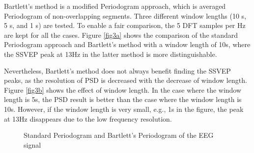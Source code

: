 \documentclass[10pt]{article}
\begin{document}
Bartlett’s method is a modified Periodogram approach, which is averaged 
Periodogram of non-overlapping segments. Three different window lengths 
(10 s, 5 s, and 1 s) are tested. To enable a fair comparison, the 5 DFT 
samples per Hz are kept for all the cases. Figure \ref{fig3a} shows the comparison 
of the standard Periodogram approach and Bartlett’s method with a window 
length of 10s, where the SSVEP peak at 13Hz in the latter method is more 
distinguishable. 

Nevertheless, Bartlett’s method does not always benefit finding the SSVEP 
peaks, as the resolution of PSD is decreased with the decrease of window 
length. Figure \ref{fig3b} shows the effect of window length. In the case where the 
window length is 5s, the PSD result is better than the case where the 
window length is 10s. However, if the window length is very small, 
e.g., 1s in the figure, the peak at 13Hz disappears due to the low 
frequency resolution.

\begin{figure}[htbp]
    \centering
    \caption{Standard Periodogram and Bartlett's Periodogram of the EEG signal}
    \label{fig3}
\end{figure}
\end{document}
